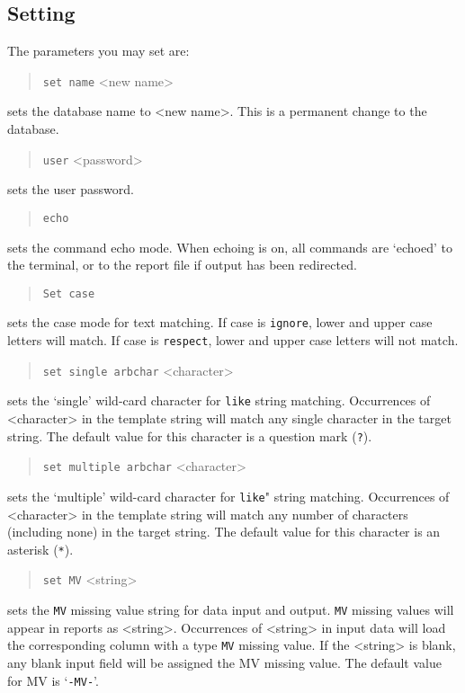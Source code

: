 \documentclass[11pt,a4paper]{report}
\begin{document}
\subsection{Setting}
The parameters you may set are:
%
\label{set}
\begin{verse}
  \verb!set name! <new name>
\end{verse}
sets the database name to <new name>.
This is a permanent change to the database.
%
%
\label{ucmd-section}
\begin{verse}
 \verb!user! <password>
\end{verse}
sets the user password.
%
\label{echo-mode}
\begin{verse}
 \verb!echo! 
\end{verse}
sets the command echo mode.  When echoing is on, all commands
are `echoed' to the terminal, or to the report file if
output has been redirected.
%
\begin{verse}
\verb!Set case! 
\end{verse}
sets the case mode for text matching.
If case is \verb!ignore!,
lower and upper case letters will match.
If case is \verb!respect!,
lower and upper case letters will not match.
%
\begin{verse}
  \verb!set single arbchar! <character>
\end{verse}
sets the `single' wild-card character for \verb!like! string matching.
Occurrences of <character> in the template string will match
any single character in the target string.
The default value for this character is a question mark (\verb!?!).
%
\begin{verse}
  \verb!set multiple arbchar! <character>
\end{verse}
sets the `multiple' wild-card character for \verb!like!" string matching.
Occurrences of <character> in the template string will match
any number of characters (including none) in the target string.
The default value for this character is an asterisk (\verb!*!).
%
\begin{verse}
  \verb!set MV! <string>
\end{verse}
sets the \verb!MV! missing value string for data input and output.
\verb!MV! missing values will appear in reports as <string>.
Occurrences of <string> in input data will load the corresponding
column with a type \verb!MV! missing value.
If the <string> is blank, any blank input field will
be assigned the MV missing value.
The default value for MV is `{\tt-MV-}'.
 
\end{document}
